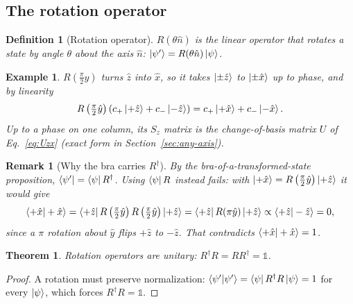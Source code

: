 \documentclass{article}
\newtheorem{theorem}{Theorem}
\newtheorem{definition}{Definition}
\newtheorem*{example}{Example}
\newtheorem{remark}{Remark}
\newcommand{\id}{\mathds{1}}
\begin{document}
\subsection{The rotation operator}
\begin{definition}[Rotation operator]
    $R(\theta\hat{n})$ is the linear operator that rotates a state by angle $\theta$ about the axis $\hat{n}$: $\ket{\psi'} = R(\theta\hat{n})\ket{\psi}$.
\end{definition}
\begin{example}
    $R\left(\tfrac{\pi}{2}\hat{y}\right)$ turns $\hat{z}$ into $\hat{x}$, so it takes $\ket{\pm\hat{z}}$ to $\ket{\pm\hat{x}}$ up to phase, and by linearity
    \[R\left(\tfrac{\pi}{2}\hat{y}\right)\left(c_+\ket{+\hat{z}} + c_-\ket{-\hat{z}}\right) = c_+\ket{+\hat{x}} + c_-\ket{-\hat{x}}.\]
    Up to a phase on one column, its $S_z$ matrix is the change-of-basis matrix $U$ of Eq.~\eqref{eq:Uzx} (exact form in Section~\ref{sec:any-axis}).
\end{example}
\begin{remark}[Why the bra carries $R^\dagger$]
    By the bra-of-a-transformed-state proposition, $\bra{\psi'} = \bra{\psi}R^\dagger$. Using $\bra{\psi}R$ instead fails: with $\ket{+\hat{x}} = R\left(\tfrac{\pi}{2}\hat{y}\right)\ket{+\hat{z}}$ it would give
    \[\braket{+\hat{x}|+\hat{x}} = \bra{+\hat{z}}R\left(\tfrac{\pi}{2}\hat{y}\right)R\left(\tfrac{\pi}{2}\hat{y}\right)\ket{+\hat{z}} = \bra{+\hat{z}}R(\pi\hat{y})\ket{+\hat{z}} \propto \braket{+\hat{z}|-\hat{z}} = 0,\]
    since a $\pi$ rotation about $\hat{y}$ flips $+\hat{z}$ to $-\hat{z}$. That contradicts $\braket{+\hat{x}|+\hat{x}} = 1$.
\end{remark}
\begin{theorem}
    Rotation operators are unitary: $R^\dagger R = RR^\dagger = \id$.
\end{theorem}
\begin{proof}
    A rotation must preserve normalization: $\braket{\psi'|\psi'} = \bra{\psi}R^\dagger R\ket{\psi} = 1$ for every $\ket{\psi}$, which forces $R^\dagger R = \id$.
\end{proof}
\end{document}
